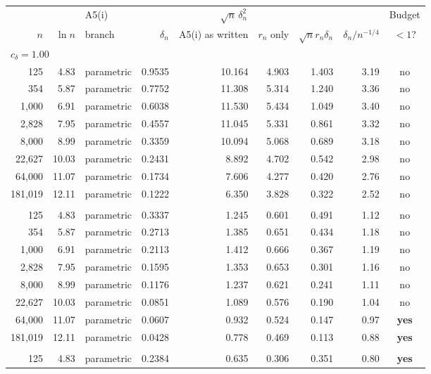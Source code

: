 \begin{tabular}{rrlrrrrrc}
\toprule
 & & A5(i) & & \multicolumn{2}{c}{$\sqrt n\,\delta_n^2$} & & & Budget \\
\cmidrule(lr){5-6}
$n$ & $\ln n$ & branch & $\delta_n$ & A5(i) as written & $r_n$ only & $\sqrt n r_n\delta_n$ & $\delta_n/n^{-1/4}$ & $<1$? \\
\midrule
\multicolumn{9}{l}{\textit{$c_\delta=1.00$}} \\
\midrule
125 & 4.83 & parametric & 0.9535 & 10.164 & 4.903 & 1.403 & 3.19 & no \\
354 & 5.87 & parametric & 0.7752 & 11.308 & 5.314 & 1.240 & 3.36 & no \\
1,000 & 6.91 & parametric & 0.6038 & 11.530 & 5.434 & 1.049 & 3.40 & no \\
2,828 & 7.95 & parametric & 0.4557 & 11.045 & 5.331 & 0.861 & 3.32 & no \\
8,000 & 8.99 & parametric & 0.3359 & 10.094 & 5.068 & 0.689 & 3.18 & no \\
22,627 & 10.03 & parametric & 0.2431 & 8.892 & 4.702 & 0.542 & 2.98 & no \\
64,000 & 11.07 & parametric & 0.1734 & 7.606 & 4.277 & 0.420 & 2.76 & no \\
181,019 & 12.11 & parametric & 0.1222 & 6.350 & 3.828 & 0.322 & 2.52 & no \\
\addlinespace
\multicolumn{9}{l}{\textit{$c_\delta=0.35$}} \\
\midrule
125 & 4.83 & parametric & 0.3337 & 1.245 & 0.601 & 0.491 & 1.12 & no \\
354 & 5.87 & parametric & 0.2713 & 1.385 & 0.651 & 0.434 & 1.18 & no \\
1,000 & 6.91 & parametric & 0.2113 & 1.412 & 0.666 & 0.367 & 1.19 & no \\
2,828 & 7.95 & parametric & 0.1595 & 1.353 & 0.653 & 0.301 & 1.16 & no \\
8,000 & 8.99 & parametric & 0.1176 & 1.237 & 0.621 & 0.241 & 1.11 & no \\
22,627 & 10.03 & parametric & 0.0851 & 1.089 & 0.576 & 0.190 & 1.04 & no \\
64,000 & 11.07 & parametric & 0.0607 & 0.932 & 0.524 & 0.147 & 0.97 & \textbf{yes} \\
181,019 & 12.11 & parametric & 0.0428 & 0.778 & 0.469 & 0.113 & 0.88 & \textbf{yes} \\
\addlinespace
\multicolumn{9}{l}{\textit{$c_\delta=0.25$}} \\
\midrule
125 & 4.83 & parametric & 0.2384 & 0.635 & 0.306 & 0.351 & 0.80 & \textbf{yes} \\

\end{tabular}
